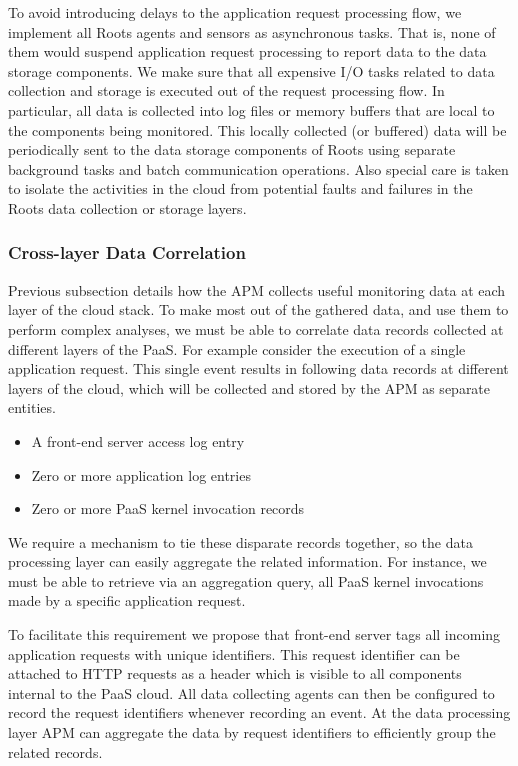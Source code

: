 To avoid introducing delays to the application request processing flow, we implement
all Roots agents and sensors as asynchronous tasks. That is, none of them would
suspend application request processing to report data to the data storage components.
We make sure that all expensive I/O tasks related to data collection and storage is
executed out of the request processing flow.
In particular, all data is collected into log files or memory buffers that are local to the components being
monitored. This locally collected (or buffered) data will be periodically sent
to the data storage components of Roots using separate background tasks and batch communication
operations. Also special care is taken to isolate the activities in the cloud from potential
faults and failures in the Roots data collection or storage layers. 

\subsubsection{Cross-layer Data Correlation}
Previous subsection details how the APM collects useful monitoring data at each layer of the cloud
stack. To make most out of the gathered data, and use them to perform complex analyses, 
we must be able to correlate data records collected at different layers of the PaaS. For example consider
the execution of a single application request. This single event results in following data records at
different layers of the cloud, which will be collected and stored by the APM as separate entities.

\begin{itemize}
\item A front-end server access log entry
\item Zero or more application log entries
\item Zero or more PaaS kernel invocation records
\end{itemize}

We require a mechanism to tie these disparate records together, so the data processing layer can easily
aggregate the related information. For instance, we must be able to retrieve via an
aggregation query, all PaaS kernel invocations made by a specific application request.

To facilitate this requirement we propose that front-end server tags all incoming application requests 
with unique identifiers.
This request identifier can be attached to HTTP requests as a header which is visible to all components 
internal to the PaaS cloud. All data collecting agents can then be configured to record the request identifiers
whenever recording an event. At the data processing layer APM can aggregate the data by request identifiers
to efficiently group the related records.

